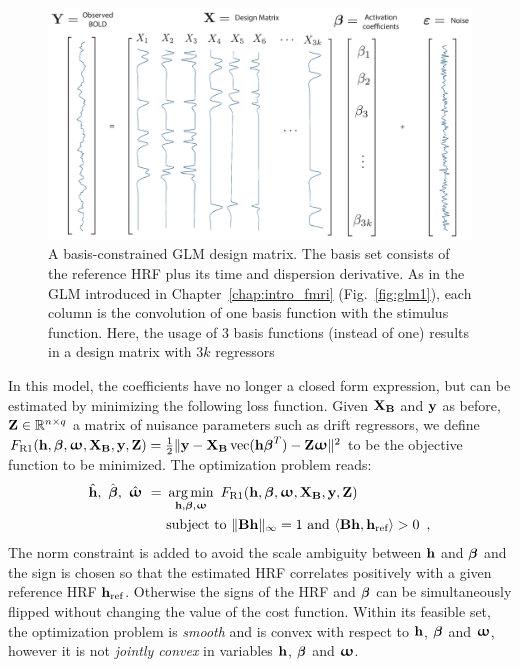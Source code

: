 \begin{figure}[t]
\centering \includegraphics[width=0.8\linewidth]{figures/chapter_1/glm_3hrf.pdf}
\caption{A basis-constrained GLM design matrix. The basis set consists of the reference HRF plus its time and dispersion derivative. As in the GLM introduced in Chapter~\ref{chap:intro_fmri} (Fig.~\ref{fig:glm1}), each column is the convolution of one basis function with the stimulus function. Here, the usage of 3 basis functions (instead of one) results in a design matrix with $3 k$ regressors}\label{fig:glm_3hrf}
\end{figure}


In this model, the coefficients have no longer a closed form expression,
but can be estimated by minimizing the following loss function. Given $\mathbf{X}_{\mathbf{B}}$ and $\mathbf{y}$ as before, $\mathbf{Z} \in {\mathbb R}^{n \times q}$ a matrix of nuisance parameters such as drift regressors, we define $F_{\text{R1}}(\mathbf{h}, {\boldsymbol \beta}, {\boldsymbol \upomega}, \mathbf{X}_{\mathbf{B}}, \mathbf{y}, \mathbf{Z}) = \frac{1}{2}\|\mathbf{y} - \mathbf{X}_{\mathbf{B}} \operatorname*{vec}(\mathbf{h} {\boldsymbol \beta}^T) - \mathbf{Z} {{\boldsymbol \upomega}}\| ^2$ to be the objective function to be minimized. The optimization problem reads:
%
\begin{eqnarray}
\label{eq:r1}
\begin{aligned}
\hat{\B{h}}, ~\hat{\bfbeta},~ \hat{\bfomega} ~=~& \argmin_{\B{h}, \bfbeta, {\bfomega}} ~ F_{\text{R1}}(\B{h}, \bfbeta, \bfomega, \B{X}_{\B{B}}, \B{y}, \B{Z})\\
&\text{subject to } \|\B{B} \B{h}\|_{\infty} = 1 \text{ and } \langle \B{B} \B{h}, \B{h}_{\text{ref}}\rangle > 0 \enspace ,
\end{aligned}
\end{eqnarray}
%
The norm constraint is added to avoid the scale ambiguity between $\mathbf{h}$ and ${\boldsymbol \beta}$
and the sign is chosen so that the estimated HRF correlates
positively with a given reference HRF $\mathbf{h}_{\text{ref}}$.
Otherwise the signs of the HRF and ${\boldsymbol \beta}$ can be simultaneously flipped without changing
the value of the cost function. Within its feasible set, the optimization problem
is {\it smooth} and is convex with respect to $\mathbf{h}$, ${\boldsymbol \beta}$ and ${\boldsymbol \upomega}$,
 however it is not {\it jointly convex} in variables $\mathbf{h}$, ${\boldsymbol \beta}$ and ${\boldsymbol \upomega}$.

